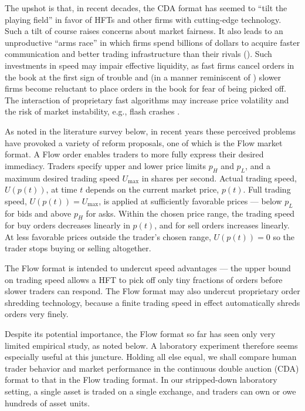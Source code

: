 \documentclass[12pt]{article}
\begin{document}
The upshot is that, in recent decades, the CDA format has 
seemed to ``tilt the playing field'' in favor of HFTs and other firms with cutting-edge technology. 
Such a tilt of course raises concerns about market fairness. 
It also
leads to an unproductive ``arms race'' in which firms spend billions of dollars to acquire faster communication and better trading infrastructure than their rivals (\cite{Budish2015}).
Such investments in speed may impair  effective liquidity, as fast firms cancel orders in the book at the first sign of trouble and 
(in a manner reminiscent of \citealp{Easly2012}) slower firms become reluctant to place orders in the book for fear of being picked off.
The interaction of proprietary fast algorithms may increase price volatility and the risk of market instability, e.g., flash crashes \citep{aldrich2017flash}.

As noted in the literature survey below, in recent years these perceived problems have provoked a variety of reform proposals, one of which is the Flow market format. 
A Flow order
enables traders to more fully express their desired immediacy. 
Traders specify upper and lower price limits $p_H$ and $p_L$, and a maximum desired trading speed $U_{\max}$ in shares per second. 
Actual trading speed, \(U(p(t))\), at time $t$ depends on the current market price, \(p(t)\). Full trading speed,
$U(p(t))=U_{\max}$, is applied at sufficiently favorable prices --- below \(p_L\) for bids and above \(p_H\) for asks. Within the chosen price range, the trading speed for buy orders decreases linearly in $p(t)$, and for sell orders increases linearly.
At less favorable prices outside the trader's chosen range,
$U(p(t))=0$ so the trader stops buying or selling altogether. 

The Flow format is intended to undercut speed advantages --- the upper bound on trading speed allows a HFT to pick off only tiny fractions of orders before slower traders can respond. 
The Flow format may also undercut proprietary order shredding technology, because a finite trading speed in effect automatically  shreds orders very finely. 

Despite its potential importance, the Flow format so far has seen only very limited empirical study, as noted below. 
A laboratory experiment therefore seems especially useful at this juncture. 
Holding all else equal, we shall compare human trader behavior and market performance in the continuous double auction (CDA) format to that in the  Flow trading format. In our stripped-down laboratory setting, a single asset is traded on a single exchange, and traders can own or owe hundreds of asset units. 
\end{document}
